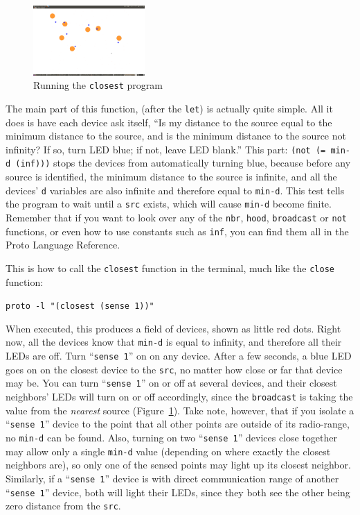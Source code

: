 \documentclass{article}
\newcommand\code[1]{\begin{center}\var{#1}\end{center}}
\newcommand\var[1]{{\tt #1}}
\newcommand\qvar[1]{``{\tt #1}''}
\begin{document}
\begin{figure}
  \includegraphics[width=0.38\textwidth]{figures/closest.png}
  \caption{Running the \var{closest} program}
  \label{f:closest}
\end{figure}

The main part of this function, (after the \var{let}) is actually
quite simple.  All it does is have each device ask itself, ``Is my
distance to the source equal to the minimum distance to the source,
and is the minimum distance to the source not infinity? If so, turn
LED blue; if not, leave LED blank.''  This part: \var{(not (= min-d
  (inf)))} stops the devices from automatically turning blue, because
before any source is identified, the minimum distance to the source is
infinite, and all the devices' \var{d} variables are also infinite and
therefore equal to \var{min-d}.  This test tells the program to wait
until a \var{src} exists, which will cause \var{min-d} become finite.
Remember that if you want to look over any of the \var{nbr},
\var{hood}, \var{broadcast} or \var{not} functions, or even how to
use constants such as \var{inf}, you can find them all in the Proto
Language Reference.

This is how to call the \var{closest} function in the terminal, much like
the \var{close} function:

\code{proto -l "(closest (sense 1))"}

When executed, this produces a field of devices, shown as little red
dots.  Right now, all the devices know that \var{min-d} is equal to
infinity, and therefore all their LEDs are off.  Turn \qvar{sense 1}
on on any device.  After a few seconds, a blue LED goes on on the
closest device to the \var{src}, no matter how close or far that
device may be.  You can turn \qvar{sense 1} on or off at several
devices, and their closest neighbors' LEDs will turn on or off
accordingly, since the \var{broadcast} is taking the value from the
{\em nearest} source (Figure~\ref{f:closest}).  Take note, however,
that if you isolate a \qvar{sense 1} device to the point that all
other points are outside of its radio-range, no \var{min-d} can be
found.  Also, turning on two \qvar{sense 1} devices close together may
allow only a single \var{min-d} value (depending on where exactly the
closest neighbors are), so only one of the sensed points may light up
its closest neighbor.  Similarly, if a \qvar{sense 1} device is with
direct communication range of another \qvar{sense 1} device, both will
light their LEDs, since they both see the other being zero distance
from the \var{src}.
\end{document}
